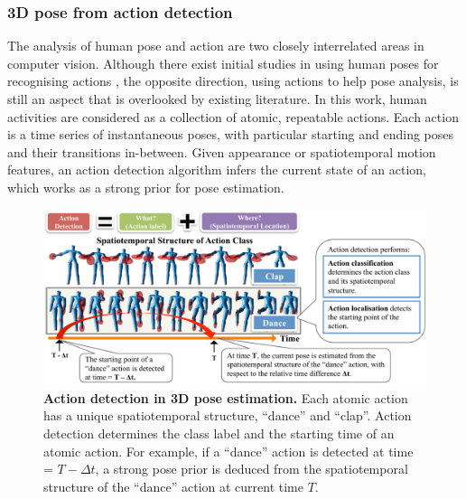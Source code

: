 \subsubsection{3D pose from action detection} 

The analysis of human pose and action are two closely interrelated areas in computer vision. Although there exist initial studies in using human poses for recognising actions \cite{Yao2012, Wang2012}, the opposite direction, \ie using actions to help pose analysis, 
is still an aspect that is overlooked by existing literature. 
In this work, human activities are considered as a collection of atomic, repeatable actions. 
Each action is a time series of instantaneous poses, with particular starting and ending poses and their transitions in-between. Given appearance or spatiotemporal motion features, an action detection algorithm infers the current state of an action, which works as a strong prior for pose estimation.   

\begin{figure}[th]
	\centering
	\includegraphics[width=1\linewidth]{fig/body/body_intro1.pdf} 
	\caption{\textbf{Action detection in 3D pose estimation.} Each atomic action has a unique spatiotemporal structure, \eg ``dance'' and ``clap''. Action detection determines the class label and the starting time of an atomic action. For example, if a ``dance'' action is detected at time = $T-\Delta t$, a strong pose prior is deduced from the spatiotemporal structure of the ``dance'' action at current time $T$.
	}
	\label{fig/body/actionexplain}
\end{figure}

